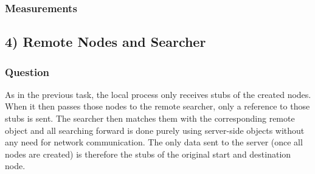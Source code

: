 \documentclass{scrartcl}
\begin{document}
    \subsubsection*{Measurements}
    \subsection*{4) Remote Nodes and Searcher}
    \subsubsection*{Question}
    As in the previous task, the local process only receives stubs of the created nodes. When it then passes those nodes to the remote searcher, only a reference to those stubs is sent. The searcher then matches them with the corresponding remote object and all searching forward is done purely using server-side objects without any need for network communication. The only data sent to the server (once all nodes are created) is therefore the stubs of the original start and destination node.
\end{document}
